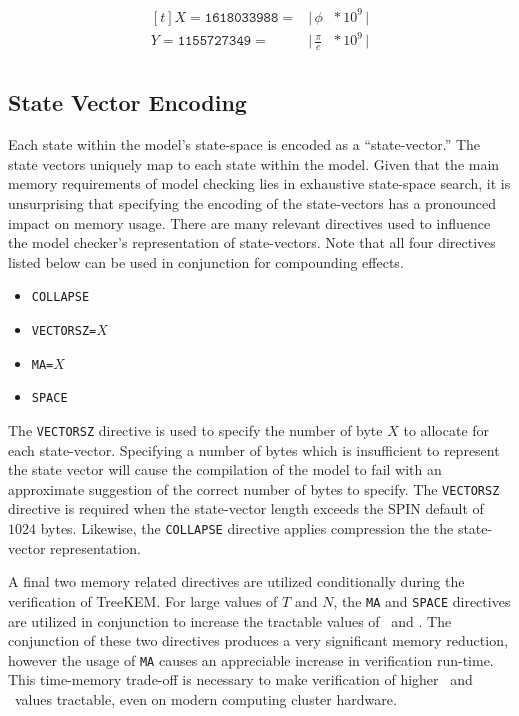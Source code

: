 \begin{equation}
\begin{aligned}[t]
X = \texttt{1618033988} = & \bigg | \, \phi          \!\!\!\! & * \, 10^9 \, \bigg |\\
Y = \texttt{1155727349} = & \bigg | \, \frac{\pi}{e} \!\!\!\! & * \, 10^9 \, \bigg |\\
\end{aligned}
\end{equation}


\hypertarget{state-vector-encoding}{%
\subsection{State Vector Encoding}\label{state-vector-encoding}}

Each state within the model's state-space is encoded as a ``state-vector.''
The state vectors uniquely map to each state within the model.
Given that the main memory requirements of model checking lies in exhaustive state-space search, it is unsurprising that specifying the encoding of the state-vectors has a pronounced impact on memory usage.
There are many relevant directives used to influence the model checker's representation of state-vectors.
Note that all four directives listed below can be used in conjunction for compounding effects.

\begin{itemize}
\item \texttt{COLLAPSE}
\item \texttt{VECTORSZ=}\(X\)
\item \texttt{MA=}\(X\)
\item \texttt{SPACE}
\end{itemize}

The \texttt{VECTORSZ} directive is used to specify the number of byte \(X\) to allocate for each state-vector.
Specifying a number of bytes which is insufficient to represent the state vector will cause the compilation of the model to fail with an approximate suggestion of the correct number of bytes to specify.
The \texttt{VECTORSZ} directive is required when the state-vector length exceeds the SPIN default of \(1024\) bytes.
Likewise, the \texttt{COLLAPSE} directive applies compression the the state-vector representation.

A final two memory related directives are utilized conditionally during the verification of TreeKEM.\@
For large values of \(T\) and \(N\), the \texttt{MA} and \texttt{SPACE} directives are utilized in conjunction to increase the tractable values of \Tmax\ and \Nmax.
The conjunction of these two directives produces a very significant memory reduction, however the usage of \texttt{MA} causes an appreciable increase in verification run-time.
This time-memory trade-off is necessary to make verification of higher \Tmax\ and \Nmax\ values tractable, even on modern computing cluster hardware.

